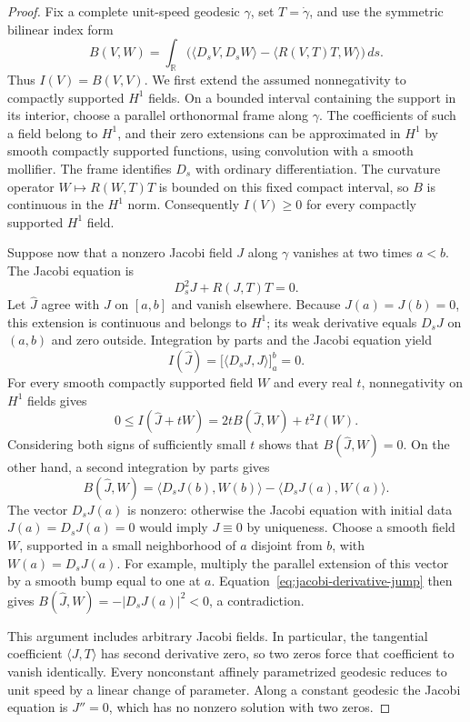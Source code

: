 \begin{proof}
Fix a complete unit-speed geodesic $\gamma$, set $T=\dot\gamma$, and use
the symmetric bilinear index form
\[
 B(V,W)=\int_{\mathbb R}
   \bigl(\langle D_sV,D_sW\rangle
        -\langle R(V,T)T,W\rangle\bigr)\,ds.
\]
Thus $I(V)=B(V,V)$.  We first extend the assumed nonnegativity to
compactly supported $H^1$ fields.  On a bounded interval containing the
support in its interior, choose a parallel orthonormal frame along
$\gamma$.  The coefficients of such a field belong to $H^1$, and their
zero extensions can be approximated in $H^1$ by smooth compactly
supported functions, using convolution with a smooth mollifier.
The frame identifies $D_s$ with ordinary differentiation.  The
curvature operator $W\mapsto R(W,T)T$ is bounded on this fixed compact
interval, so $B$ is continuous in the $H^1$ norm.  Consequently
$I(V)\geq0$ for every compactly supported $H^1$ field.

Suppose now that a nonzero Jacobi field $J$ along $\gamma$ vanishes at
two times $a<b$.  The Jacobi equation is
\[
 D_s^2J+R(J,T)T=0.
\]
Let $\widehat J$ agree with $J$ on $[a,b]$ and vanish elsewhere.  Because
$J(a)=J(b)=0$, this extension is continuous and belongs to $H^1$; its
weak derivative equals $D_sJ$ on $(a,b)$ and zero outside.
Integration by parts and the Jacobi equation yield
\[
 I(\widehat J)
 =\bigl[\langle D_sJ,J\rangle\bigr]_{a}^{b}=0.
\]
For every smooth compactly supported field $W$ and every real $t$,
nonnegativity on $H^1$ fields gives
\[
 0\leq I(\widehat J+tW)
       =2tB(\widehat J,W)+t^2I(W).
\]
Considering both signs of sufficiently small $t$ shows that
$B(\widehat J,W)=0$.  On the other hand, a second integration by parts
gives
\begin{equation}
 B(\widehat J,W)
   =\langle D_sJ(b),W(b)\rangle
       -\langle D_sJ(a),W(a)\rangle.
 \label{eq:jacobi-derivative-jump}
\end{equation}
The vector $D_sJ(a)$ is nonzero: otherwise the Jacobi equation with
initial data $J(a)=D_sJ(a)=0$ would imply $J\equiv0$ by uniqueness.
Choose a smooth field $W$, supported in a small neighborhood of $a$
disjoint from $b$, with $W(a)=D_sJ(a)$.  For example, multiply the
parallel extension of this vector by a smooth bump equal to one at
$a$.  Equation~\eqref{eq:jacobi-derivative-jump} then gives
$B(\widehat J,W)=-|D_sJ(a)|^2<0$, a contradiction.

This argument includes arbitrary Jacobi fields.  In particular, the
tangential coefficient $\langle J,T\rangle$ has second derivative
zero, so two zeros force that coefficient to vanish identically.
Every nonconstant affinely parametrized geodesic reduces to unit speed
by a linear change of parameter.  Along a constant geodesic the Jacobi
equation is $J''=0$, which has no nonzero solution with two zeros.
\end{proof}

